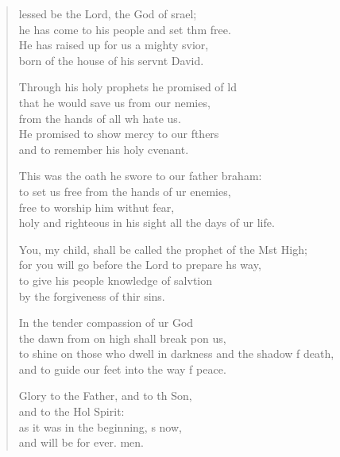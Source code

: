 \settowidth{\versewidth}{to shine on those who dwell in darkness and the shadow of death, *}
\begin{verse}%
  \begin{patverse}
lessed be the Lord, the God of srael;\Med\\
he has come to his people and set thm free.\\
He has raised up for us a mighty svior,\Med\\
born of the house of his servnt David.

Through his holy prophets he promised of ld\Flex\\
that he would save us from our nemies,\Med\\
from the hands of all wh hate us.\\
He promised to show mercy to our fthers\Med\\
and to remember his holy cvenant.

This was the oath he swore to our father braham:\Med\\
to set us free from the hands of ur enemies,\\
free to worship him withut fear,\Med\\
holy and righteous in his sight all the days of ur life.

You, my child, shall be called the prophet of the Mst High;\Med\\
for you will go before the Lord to prepare h\pointup{\i}s way,\\
to give his people knowledge of salvtion\Med\\
by the forgiveness of thir sins.

In the tender compassion of ur God\Med\\
the dawn from on high shall break pon us,\\
to shine on those who dwell in darkness and the shadow f death,\Med\\
and to guide our feet into the way f peace.

Glory to the Father, and to th Son,\Med\\
and to the Hol Spirit:\\
as it was in the beginning, \pointup{\i}s now,\Med\\
and will be for ever. men.
  \end{patverse}
  \end{verse}
